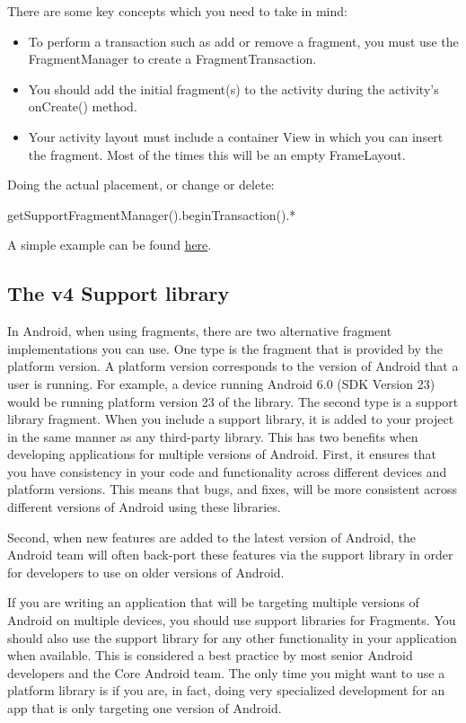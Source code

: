 There are some key concepts which you need to take in mind:
\begin{itemize}
	\item To perform a transaction such as add or remove a fragment, you must use the FragmentManager to create a FragmentTransaction.
	\item You should add the initial fragment(s) to the activity during the activity's onCreate() method.
	\item  Your activity layout must include a container View in which you can insert the fragment. Most of the times this will be an empty FrameLayout.
\end{itemize}

Doing the actual placement, or change or delete:

\begin{android}
	 getSupportFragmentManager().beginTransaction().*
\end{android}

 A simple example can be found \href{https://github.com/commonsguy/cw-omnibus/tree/master/Fragments/Dynamic}{here}.



\subsection{The v4 Support library}
In Android, when using fragments, there are two alternative fragment implementations you can use. One type is the fragment that is provided by the platform version. A platform version corresponds to the version of Android that a user is running. For example, a device running Android 6.0 (SDK Version 23) would be running platform version 23 of the library.
The second type is a support library fragment. When you include a support library, it is added to your project in the same manner as any third-party library. This has two benefits when developing applications for multiple versions of Android.
First, it ensures that you have consistency in your code and functionality across different devices and platform versions. This means that bugs, and fixes, will be more consistent across different versions of Android using these libraries.

Second, when new features are added to the latest version of Android, the Android team will often back-port these features via the support library in order for developers to use on older versions of Android.

\begin{framed}
If you are writing an application that will be targeting multiple versions of Android on multiple devices, you should use support libraries for Fragments. You should also use the support library for any other functionality in your application when available. This is considered a best practice by most senior Android developers and the Core Android team. The only time you might want to use a platform library is if you are, in fact, doing very specialized development for an app that is only targeting one version of Android.
\end{framed}

